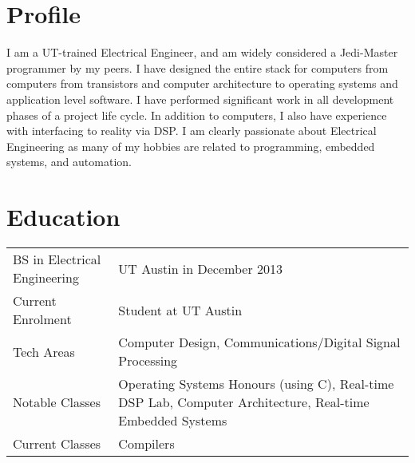 \documentclass[letterpaper,12pt]{resume}
\begin{document}
\let\olditemize\itemize
\renewcommand{\itemize}{
  \olditemize
  \setlength{\itemsep}{1pt}
  \setlength{\parskip}{0pt}
  \setlength{\parsep}{0pt}
}

\author{James Brisson}
\maketitle

\section{Profile}
\noindent
I am a UT-trained Electrical Engineer, and am widely considered a Jedi-Master programmer by my peers.
I have designed the entire stack for computers from computers from transistors and computer architecture to operating systems and application level software. 
I have performed significant work in all development phases of a project life cycle.
In addition to computers, I also have experience with interfacing to reality via DSP.
I am clearly passionate about Electrical Engineering as many of my hobbies are related to programming, embedded systems, and automation.

\section{Education}
\noindent
\begin{tabular}{p{}p{}}
  BS in Electrical Engineering&
  UT Austin in December 2013\\
  \noalign{\smallskip}
  Current Enrolment&
  Student at UT Austin\\
  \noalign{\smallskip}
  Tech Areas&
  Computer Design, Communications/Digital Signal Processing\\
  \noalign{\smallskip}
  Notable Classes&
  Operating Systems Honours (using C), Real-time DSP Lab, Computer Architecture, Real-time Embedded Systems\\
  \noalign{\smallskip}
  Current Classes&
  Compilers\\
\end{tabular}
\end{document}
